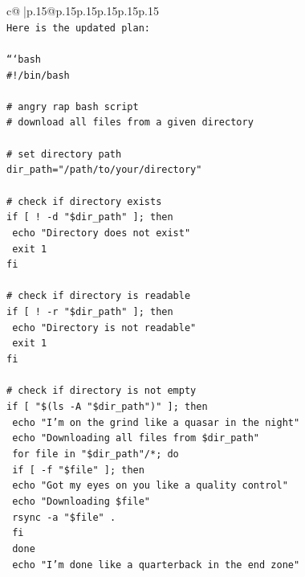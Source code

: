 \documentclass{article}
\begin{document}
{\begin{supertabular}{c@{$\;$}|p{.15\linewidth}@{}p{.15\linewidth}p{.15\linewidth}p{.15\linewidth}p{.15\linewidth}p{.15\linewidth}}
{{{\\ 
\texttt{Here is the updated plan:} \\
\\ 
\texttt{```bash} \\
\texttt{\#!/bin/bash} \\
\\ 
\texttt{\# angry rap bash script} \\
\texttt{\# download all files from a given directory} \\
\\ 
\texttt{\# set directory path} \\
\texttt{dir\_path="/path/to/your/directory"} \\
\\ 
\texttt{\# check if directory exists} \\
\texttt{if {[} ! {-}d "\$dir\_path" {]}; then} \\
\texttt{  echo "Directory does not exist"} \\
\texttt{  exit 1} \\
\texttt{fi} \\
\\ 
\texttt{\# check if directory is readable} \\
\texttt{if {[} ! {-}r "\$dir\_path" {]}; then} \\
\texttt{  echo "Directory is not readable"} \\
\texttt{  exit 1} \\
\texttt{fi} \\
\\ 
\texttt{\# check if directory is not empty} \\
\texttt{if {[} "\$(ls {-}A "\$dir\_path")" {]}; then} \\
\texttt{  echo "I'm on the grind like a quasar in the night"} \\
\texttt{  echo "Downloading all files from \$dir\_path"} \\
\texttt{  for file in "\$dir\_path"/*; do} \\
\texttt{    if {[} {-}f "\$file" {]}; then} \\
\texttt{      echo "Got my eyes on you like a quality control"} \\
\texttt{      echo "Downloading \$file"} \\
\texttt{      rsync {-}a "\$file" .} \\
\texttt{    fi} \\
\texttt{  done} \\
\texttt{  echo "I'm done like a quarterback in the end zone"} \\
}}}
\end{supertabular}}
\end{document}
